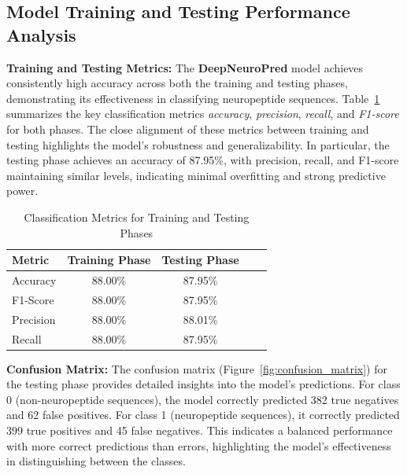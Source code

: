 \documentclass[conference]{IEEEtran}
\begin{document}
\subsection{Model Training and Testing Performance Analysis}

\textbf{Training and Testing Metrics:} The \textbf{DeepNeuroPred} model achieves consistently high accuracy across both the training and testing phases, demonstrating its effectiveness in classifying neuropeptide sequences. Table~\ref{table:train_test_report} summarizes the key classification metrics \textit{accuracy}, \textit{precision}, \textit{recall}, and \textit{F1-score} for both phases. The close alignment of these metrics between training and testing highlights the model's robustness and generalizability. In particular, the testing phase achieves an accuracy of 87.95\%, with precision, recall, and F1-score maintaining similar levels, indicating minimal overfitting and strong predictive power.

\begin{table}[h]
\centering
\label{table:train_test_report}
\renewcommand{\arraystretch}{1.3}
\begin{tabular}{lcccc}
\hline
\textbf{Metric} & \textbf{Training Phase} & \textbf{Testing Phase} \\ \hline
Accuracy        & 88.00\%                 & 87.95\%                \\
F1-Score        & 88.00\%                 & 87.95\%                \\
Precision       & 88.00\%                 & 88.01\%                \\
Recall          & 88.00\%                 & 87.95\%                \\ \hline
\end{tabular}
\vspace{.6em}
\caption{Classification Metrics for Training and Testing Phases}
\vspace{-2.5em}
\end{table}

\textbf{Confusion Matrix:} The confusion matrix 
(Figure~\ref{fig:confusion_matrix}) for the testing phase provides detailed insights into the model's predictions. For class 0 (non-neuropeptide sequences), the model correctly predicted 382 true negatives and 62 false positives. For class 1 (neuropeptide sequences), it correctly predicted 399 true positives and 45 false negatives. This indicates a balanced performance with more correct predictions than errors, highlighting the model's effectiveness in distinguishing between the classes.
\end{document}
